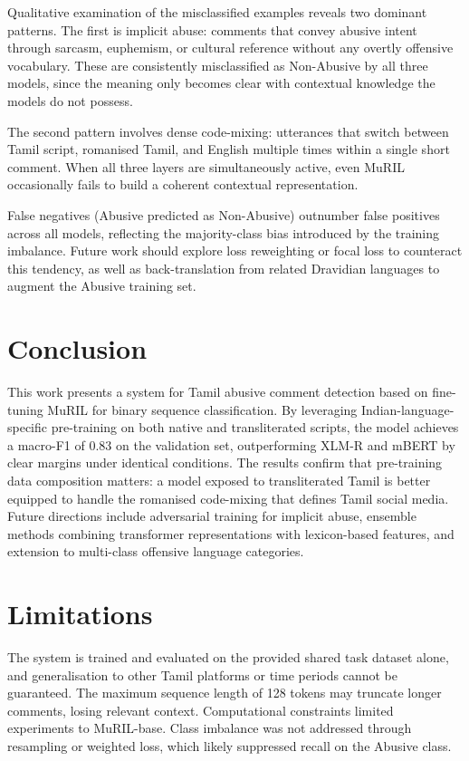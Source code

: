 \documentclass[11pt]{article}
\begin{document}
Qualitative examination of the misclassified examples reveals two dominant patterns. The first is implicit abuse: comments that convey abusive intent
through sarcasm, euphemism, or cultural reference
without any overtly offensive vocabulary. These
are consistently misclassified as Non-Abusive by
all three models, since the meaning only becomes
clear with contextual knowledge the models do not
possess.

The second pattern involves dense code-mixing:
utterances that switch between Tamil script, romanised Tamil, and English multiple times within a
single short comment. When all three layers are
simultaneously active, even MuRIL occasionally
fails to build a coherent contextual representation.

False negatives (Abusive predicted as Non-Abusive) outnumber false positives across all models, reflecting the majority-class bias introduced
by the training imbalance. Future work should explore loss reweighting or focal loss to counteract
this tendency, as well as back-translation from related Dravidian languages to augment the Abusive
training set.

\section{Conclusion}

This work presents a system for Tamil abusive
comment detection based on fine-tuning MuRIL
for binary sequence classification. By leveraging
Indian-language-specific pre-training on both native and transliterated scripts, the model achieves a
macro-F1 of 0.83 on the validation set, outperforming XLM-R and mBERT by clear margins under
identical conditions. The results confirm that pre-training data composition matters: a model exposed
to transliterated Tamil is better equipped to handle
the romanised code-mixing that defines Tamil social media. Future directions include adversarial
training for implicit abuse, ensemble methods combining transformer representations with lexicon-based features, and extension to multi-class offensive language categories.

\section*{Limitations}

The system is trained and evaluated on the provided shared task dataset alone, and generalisation
to other Tamil platforms or time periods cannot
be guaranteed. The maximum sequence length of
128 tokens may truncate longer comments, losing
relevant context. Computational constraints limited experiments to MuRIL-base. Class imbalance
was not addressed through resampling or weighted
loss, which likely suppressed recall on the Abusive
class.
\end{document}
